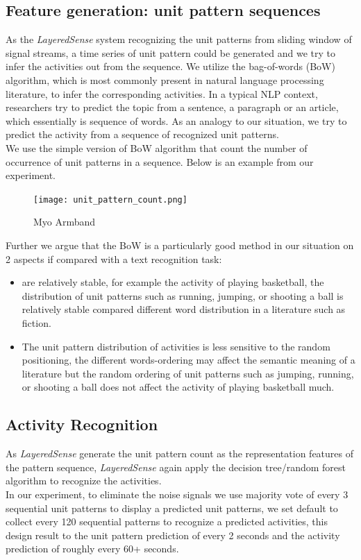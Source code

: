 \documentclass[a4paper, 10pt, conference]{IEEEtran}      %
\begin{document}
\subsection{Feature generation: unit pattern sequences}
As the \emph{LayeredSense} system recognizing the unit patterns from sliding window of signal streams, a time series of unit pattern could be generated and we try to infer the activities out from the sequence. We utilize the bag-of-words (BoW) algorithm, which is most commonly present in natural language processing literature, to infer the corresponding activities. In a typical NLP context, researchers try to predict the topic from a sentence, a paragraph or an article, which essentially is sequence of words. As an analogy to our situation, we try to predict the activity from a sequence of recognized unit patterns. \\
We use the simple version of BoW algorithm that count the number of occurrence of unit patterns in a sequence. Below is an example from our experiment.

\begin{figure}[thpb]
      \centering
      \texttt{[image: unit\_pattern\_count.png]} 
      \caption{Myo Armband}
      \label{img_label2}
\end{figure}     


Further we argue that the BoW is a particularly good method in our situation on 2 aspects if compared with a text recognition task:
 \begin{itemize}
 \item  are relatively stable, for example the activity of playing basketball, the distribution of unit patterns such as running, jumping, or shooting a ball is relatively stable compared different word distribution in a literature such as fiction.
 \item The unit pattern distribution of activities is less sensitive to the random positioning, the different words-ordering may affect the semantic meaning of a literature but the random ordering of unit patterns such as jumping, running, or shooting a ball does not affect the activity of playing basketball much.
 \end {itemize}
 
 
\subsection{Activity Recognition}
As \emph{LayeredSense} generate the unit pattern count as the representation features of the pattern sequence, \emph{LayeredSense} again apply the decision tree/random forest algorithm to recognize the activities.\\
In our experiment, to eliminate the noise signals we use majority vote of every 3 sequential unit patterns to display a predicted unit patterns, we set default to collect every 120 sequential patterns to recognize a predicted activities, this design result to the unit pattern prediction of every 2 seconds and the activity prediction of roughly every 60+ seconds.\\
\end{document}
